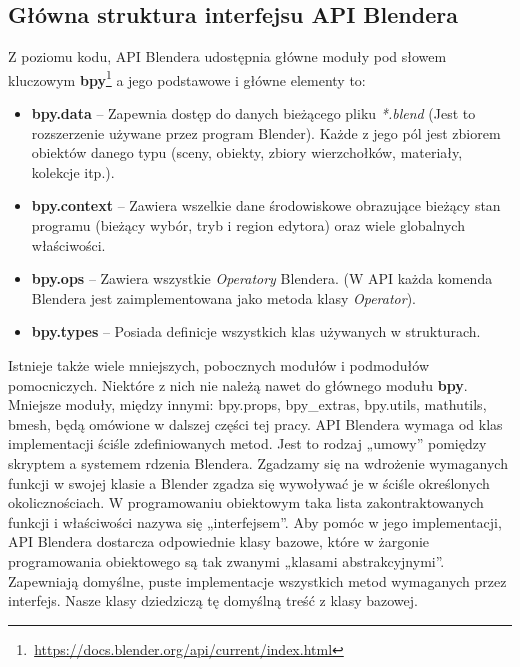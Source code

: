 \documentclass[brudnopis]{xmgr}
\begin{document}
\subsection{Główna struktura interfejsu API Blendera}
Z poziomu kodu, API Blendera udostępnia główne moduły pod słowem kluczowym \textbf{bpy}\footnote{\,\url{https://docs.blender.org/api/current/index.html}} a jego podstawowe i główne elementy to:
\begin{itemize}
\item \textbf{bpy.data} -- Zapewnia dostęp do danych bieżącego pliku \emph{*.blend} (Jest to rozszerzenie używane przez program Blender). Każde z jego pól jest zbiorem obiektów danego typu (sceny, obiekty, zbiory wierzchołków, materiały, kolekcje itp.).
\item \textbf{bpy.context} -- Zawiera wszelkie dane środowiskowe obrazujące bieżący stan programu (bieżący wybór, tryb i region edytora) oraz wiele globalnych właściwości.
\item \textbf{bpy.ops} -- Zawiera wszystkie \emph{Operatory} Blendera. (W API każda komenda Blendera jest zaimplementowana jako metoda klasy \emph{Operator}).
\item \textbf{bpy.types} -- Posiada definicje wszystkich klas używanych w strukturach.
\end{itemize}
Istnieje także wiele mniejszych, pobocznych modułów i podmodułów pomocniczych. Niektóre z nich nie należą nawet do głównego modułu \textbf{bpy}. Mniejsze moduły, między innymi: bpy.props, bpy\_extras, bpy.utils, mathutils, bmesh, będą omówione w dalszej części tej pracy.
API Blendera wymaga od klas implementacji ściśle zdefiniowanych metod. Jest to rodzaj „umowy” pomiędzy skryptem a systemem rdzenia Blendera. Zgadzamy się na wdrożenie wymaganych funkcji w swojej klasie a Blender zgadza się wywoływać je w ściśle określonych okolicznościach. W programowaniu obiektowym taka lista zakontraktowanych funkcji i właściwości nazywa się „interfejsem”. Aby pomóc w jego implementacji, API Blendera dostarcza odpowiednie klasy bazowe, które w żargonie programowania obiektowego są tak zwanymi „klasami abstrakcyjnymi”. Zapewniają domyślne, puste implementacje wszystkich metod wymaganych przez interfejs. Nasze klasy dziedziczą tę domyślną treść z klasy bazowej.
\end{document}
